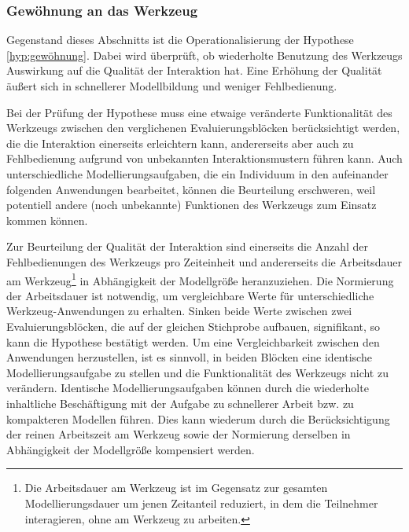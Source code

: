 
\subsubsection{Gewöhnung an das Werkzeug} %
\label{ssub:gewöhnung_an_das_werkzeug}

Gegenstand dieses Abschnitts ist die Operationalisierung der Hypothese \ref{hyp:gewöhnung}. Dabei wird überprüft, ob wiederholte Benutzung des Werkzeugs Auswirkung auf die Qualität der Interaktion hat. Eine Erhöhung der Qualität äußert sich in schnellerer Modellbildung und weniger Fehlbedienung.

Bei der Prüfung der Hypothese muss eine etwaige veränderte Funktionalität des Werkzeugs zwischen den verglichenen Evaluierungsblöcken berücksichtigt werden, die die Interaktion einerseits erleichtern kann, andererseits aber auch zu Fehlbedienung aufgrund von unbekannten Interaktionsmustern führen kann. Auch unterschiedliche Modellierungsaufgaben, die ein Individuum in den aufeinander folgenden Anwendungen bearbeitet, können die Beurteilung erschweren, weil potentiell andere (noch unbekannte) Funktionen des Werkzeugs zum Einsatz kommen können.

Zur Beurteilung der Qualität der Interaktion sind einerseits die Anzahl der Fehlbedienungen des Werkzeugs pro Zeiteinheit und andererseits die Arbeitsdauer am Werkzeug\footnote{Die Arbeitsdauer am Werkzeug ist im Gegensatz zur gesamten Modellierungsdauer um jenen Zeitanteil reduziert, in dem die Teilnehmer interagieren, ohne am Werkzeug zu arbeiten.} in Abhängigkeit der Modellgröße heranzuziehen. Die Normierung der Arbeitsdauer ist notwendig, um vergleichbare Werte für unterschiedliche Werkzeug-Anwendungen zu erhalten. Sinken beide Werte zwischen zwei Evaluierungsblöcken, die auf der gleichen Stichprobe aufbauen, signifikant, so kann die Hypothese bestätigt werden. Um eine Vergleichbarkeit zwischen den Anwendungen herzustellen, ist es sinnvoll, in beiden Blöcken eine identische Modellierungsaufgabe zu stellen und die Funktionalität des Werkzeugs nicht zu verändern. Identische Modellierungsaufgaben können durch die wiederholte inhaltliche Beschäftigung mit der Aufgabe zu schnellerer Arbeit bzw. zu kompakteren Modellen führen. Dies kann wiederum durch die Berücksichtigung der reinen Arbeitszeit am Werkzeug sowie der Normierung derselben in Abhängigkeit der Modellgröße kompensiert werden.


